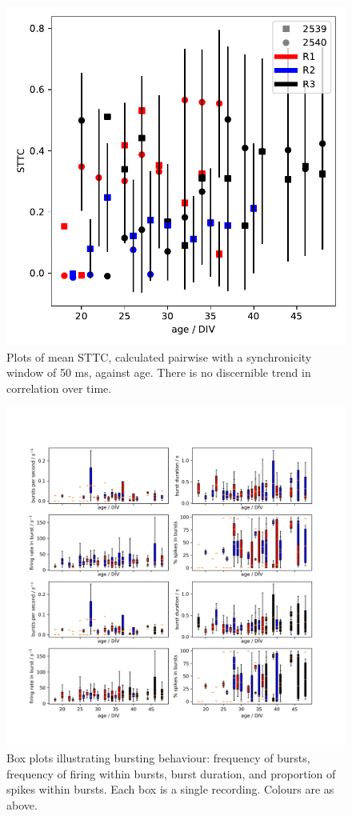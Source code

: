 \documentclass[10pt]{article}
\begin{document}
\begin{figure}
	\centering
	\includegraphics[width=\textwidth]{../plots/correlation_plots.pdf}
	\caption{Plots of mean STTC, calculated pairwise with a synchronicity window of 50 ms, against age. There is no discernible trend in correlation over time.}
	\label{fig:correlation}
\end{figure}

\begin{figure}
	\centering
	\includegraphics[width=\textwidth]{../plots/burst_boxplots.png}
	\caption{Box plots illustrating bursting behaviour: frequency of bursts, frequency of firing within bursts, burst duration, and proportion of spikes within bursts. Each box is a single recording. Colours are as above.}
	\label{fig:burst}
\end{figure}
\end{document}
